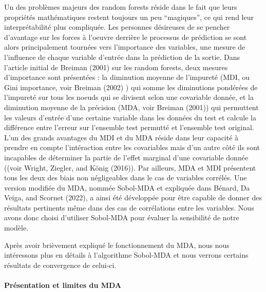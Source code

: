 \documentclass[
]{article}
\begin{document}
Un des problèmes majeurs des random forests réside dans le fait que
leurs propriétés mathématiques restent toujours un peu ``magiques'', ce
qui rend leur interprétabilité plus compliquée. Les personnes désireuses
de se pencher d'avantage sur les forces à l'oeuvre derrière le processus
de prédiction se sont alors principalement tournées vers l'importance
des variables, une mesure de l'influence de chaque variable d'entrée
dans la prédiction de la sortie. Dans l'article initial de Breiman
(2001) sur les random forests, deux mesures d'importance sont présentées
: la diminution moyenne de l'impureté (MDI, ou Gini importance, voir
Breiman (2002) ) qui somme les diminutions pondérées de l'impureté sur
tous les noeuds qui se divisent selon une covariable donnée, et la
diminution moyenne de la précision (MDA, voir Breiman (2001)) qui
permuttent les valeurs d'entrée d'une certaine variable dans les données
du test et calcule la différence entre l'erreur sur l'ensemble test
permutté et l'ensemble test original. L'un des grands avantages du MDI
et du MDA réside dans leur capacité à prendre en compte l'intéraction
entre les covariables mais d'un autre côté ils sont incapables de
déterminer la partie de l'effet marginal d'une covariable donnée ((voir
Wright, Ziegler, and König (2016)). Par ailleurs, MDA et MDI présentent
tous les deux des biais non négligeables dans le cas de variables
corrélés. Une version modifiée du MDA, nommée Sobol-MDA et expliquée
dans Bénard, Da Veiga, and Scornet (2022), a ainsi été développée pour
être capable de donner des résultats pertinents même dans des cas de
corrélations entre les variables. Nous avons donc choisi d'utiliser
Sobol-MDA pour évaluer la sensibilité de notre modèle.

Après avoir brièvement expliqué le fonctionnement du MDA, nous nous
intéressons plus en détails à l'algorithme Sobol-MDA et nous verrons
certains résultats de convergence de celui-ci.

\hypertarget{pruxe9sentation-et-limites-du-mda}{%
\paragraph{Présentation et limites du
MDA}\label{pruxe9sentation-et-limites-du-mda}}
\end{document}
